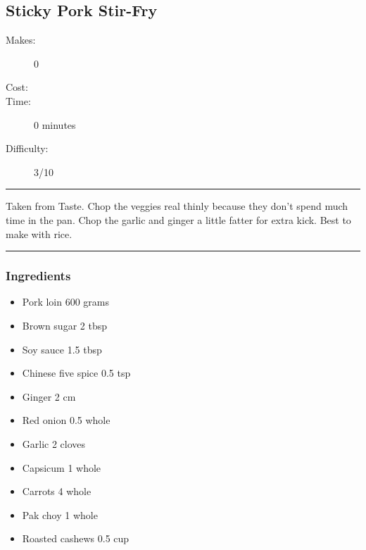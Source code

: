\documentclass[]{article}
\begin{document}
\subsection*{\center\huge Sticky Pork Stir-Fry}
\begin{description}
\item[Makes:] 0 
\item[Cost:] \textdollar
\item[Time:] 0 minutes
\item[Difficulty:] 3/10
\end{description}
\vspace{0.2cm}\hrule\vspace{0.5cm}
\begin{adjustwidth}{0.5 cm}{0.5 cm}

Taken from Taste. Chop the veggies real thinly because they don’t spend much time in the pan. Chop the garlic and ginger a little fatter for extra kick. Best to make with rice. \hfill\color{accent}{\Large\faGlide\hspace{0.1cm}\faTruck\hspace{0.1cm}}\color{black}

\end{adjustwidth}
\vspace{0.5cm}\hrule
\subsubsection*{\Large Ingredients}
\begin{multicols}{2}
\begin{itemize}
 \item Pork loin \hfill 600 grams
 \item Brown sugar \hfill 2 tbsp
 \item Soy sauce \hfill 1.5 tbsp
 \item Chinese five spice \hfill 0.5 tsp
 \item Ginger \hfill 2 cm
 \item Red onion \hfill 0.5 whole
 \item Garlic \hfill 2 cloves
 \item Capsicum \hfill 1 whole
 \item Carrots \hfill 4 whole
 \item Pak choy \hfill 1 whole
 \item Roasted cashews \hfill 0.5 cup
\end{itemize}
\end{multicols}
\end{document}
